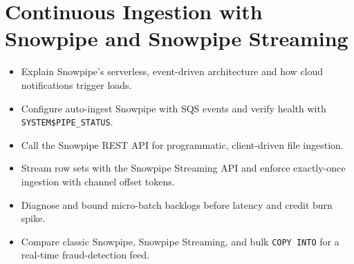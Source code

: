 \chapter{Continuous Ingestion with Snowpipe and Snowpipe Streaming}
%
\begin{objectives}
\begin{itemize}
    \item Explain Snowpipe's serverless, event-driven architecture and how cloud notifications trigger loads.
    \item Configure auto-ingest Snowpipe with SQS events and verify health with \texttt{SYSTEM\$PIPE\_STATUS}.
    \item Call the Snowpipe REST API for programmatic, client-driven file ingestion.
    \item Stream row sets with the Snowpipe Streaming API and enforce exactly-once ingestion with channel offset tokens.
    \item Diagnose and bound micro-batch backlogs before latency and credit burn spike.
    \item Compare classic Snowpipe, Snowpipe Streaming, and bulk \texttt{COPY INTO} for a real-time fraud-detection feed.
\end{itemize}
\end{objectives}

